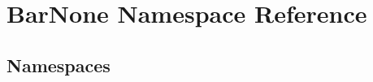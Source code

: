 \hypertarget{namespace_bar_none}{}\section{Bar\+None Namespace Reference}
\label{namespace_bar_none}
\subsection*{Namespaces}
\begin{DoxyCompactItemize}
\end{DoxyCompactItemize}
